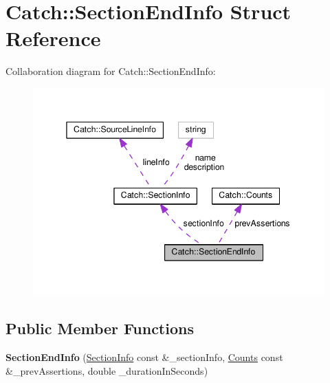 \hypertarget{structCatch_1_1SectionEndInfo}{}\section{Catch\+:\+:Section\+End\+Info Struct Reference}
\label{structCatch_1_1SectionEndInfo}


Collaboration diagram for Catch\+:\+:Section\+End\+Info\+:
\nopagebreak
\begin{figure}[H]
\begin{center}
\leavevmode
\includegraphics[width=345pt]{structCatch_1_1SectionEndInfo__coll__graph}
\end{center}
\end{figure}
\subsection*{Public Member Functions}
\begin{DoxyCompactItemize}
\item 
{\bfseries Section\+End\+Info} (\hyperlink{structCatch_1_1SectionInfo}{Section\+Info} const \&\+\_\+section\+Info, \hyperlink{structCatch_1_1Counts}{Counts} const \&\+\_\+prev\+Assertions, double \+\_\+duration\+In\+Seconds)\hypertarget{structCatch_1_1SectionEndInfo_abc9381c7c22b6907317ec985ccaa6713}{}\label{structCatch_1_1SectionEndInfo_abc9381c7c22b6907317ec985ccaa6713}

\end{DoxyCompactItemize}
